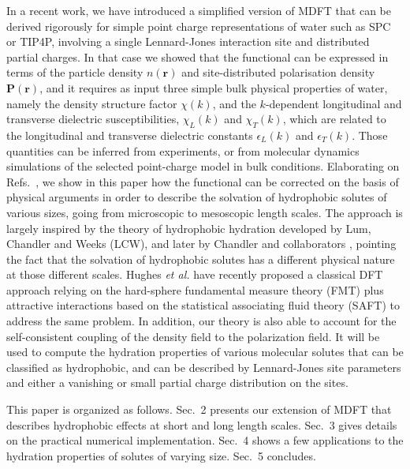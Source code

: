 \documentclass[aip,jcp,showpacs,amsmath,amssymb,superscriptaddress]{revtex4-1}
\newcommand{\rr}{\mathbf{r}}
\newcommand{\PP}{\mathbf{P}}
\begin{document}
In a recent work\cite{jeanmairet13}, we have introduced a simplified version of MDFT that can be derived rigorously for simple point charge representations of water such as SPC or TIP4P, involving a  single Lennard-Jones interaction site and distributed partial charges. In that case we showed that the functional can be expressed in terms of the particle density $n(\rr)$ and site-distributed polarisation density $\PP(\rr)$, and it requires  as input three simple bulk physical properties of water, namely the density structure factor $\chi(k)$, and the $k$-dependent longitudinal and transverse dielectric susceptibilities, $\chi_L(k)$ and $\chi_T(k)$, which are related to the longitudinal and transverse dielectric constants $\epsilon_L(k)$ and $\epsilon_T(k)$\cite{raineri92,raineri93,bopp98}. Those quantities can be inferred from experiments, or from molecular dynamics simulations of the selected point-charge model in bulk conditions\cite{bopp96,bopp98}. Elaborating on Refs.~, we  show in this paper how the  functional can be corrected on the basis of physical arguments  in order to describe the solvation of hydrophobic solutes of various sizes, going from microscopic to mesoscopic length scales. The approach is largely inspired by the theory of hydrophobic hydration developed by Lum, Chandler and Weeks (LCW)\cite{lum99}, and later by Chandler and collaborators
\cite{tenwolde01,tenwolde02,huang02,varilly11,chandler-varilly11}, pointing the fact that the solvation of hydrophobic solutes has a different physical nature at those different  scales.  Hughes {\em et al.} have recently proposed a classical DFT approach relying on the hard-sphere fundamental measure theory (FMT) plus attractive interactions based on the
statistical associating fluid theory  (SAFT)  to address the same problem\cite{roundy13}. In addition,  our theory is also able to account for the self-consistent coupling of the density field to the  polarization field. It will be used to compute the hydration properties of various molecular solutes that can be classified as hydrophobic, and can be described by  Lennard-Jones site parameters and  either a vanishing or small partial charge distribution on the sites.

This paper is organized as follows. Sec.~2 presents our extension of MDFT that describes  hydrophobic effects at short and long length scales. Sec.~3  gives details on the practical numerical implementation. Sec.~4 shows a few applications to the hydration properties of solutes of varying size. Sec.~5 concludes.
\end{document}
